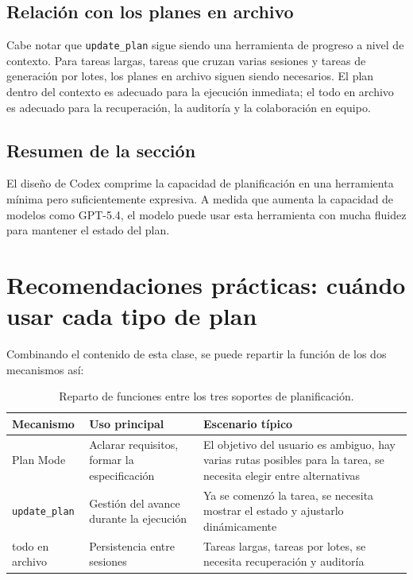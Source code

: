 \documentclass[a4paper]{article}
\begin{document}
\subsection{Relación con los planes en archivo}

Cabe notar que \texttt{update\_plan} sigue siendo una herramienta de progreso a nivel de contexto. Para tareas largas, tareas que cruzan varias sesiones y tareas de generación por lotes, los planes en archivo siguen siendo necesarios. El plan dentro del contexto es adecuado para la ejecución inmediata; el todo en archivo es adecuado para la recuperación, la auditoría y la colaboración en equipo.

\subsection{Resumen de la sección}

El diseño de Codex comprime la capacidad de planificación en una herramienta mínima pero suficientemente expresiva. A medida que aumenta la capacidad de modelos como GPT-5.4, el modelo puede usar esta herramienta con mucha fluidez para mantener el estado del plan.
\section{Recomendaciones prácticas: cuándo usar cada tipo de plan}

Combinando el contenido de esta clase, se puede repartir la función de los dos mecanismos así:

\begin{table}[H]
\centering
\begin{tabular}{lll}
\toprule
Mecanismo & Uso principal & Escenario típico \\
\midrule
Plan Mode & Aclarar requisitos, formar la especificación & El objetivo del usuario es ambiguo, hay varias rutas posibles para la tarea, se necesita elegir entre alternativas \\
\texttt{update\_plan} & Gestión del avance durante la ejecución & Ya se comenzó la tarea, se necesita mostrar el estado y ajustarlo dinámicamente \\
todo en archivo & Persistencia entre sesiones & Tareas largas, tareas por lotes, se necesita recuperación y auditoría \\
\bottomrule
\end{tabular}
\caption{Reparto de funciones entre los tres soportes de planificación.}
\end{table}
\end{document}
